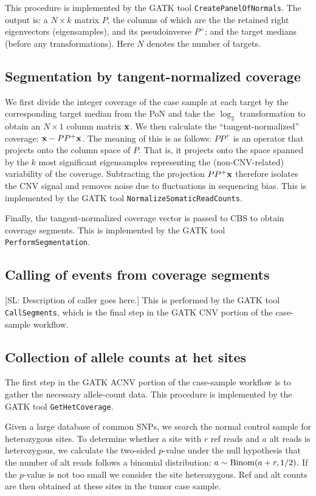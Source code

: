 \documentclass[nofootinbib,amssymb,amsmath]{revtex4}
\def\SL#1{{\color [rgb]{0,0,0.8} [SL: #1]}}
\begin{document}
This procedure is implemented by the GATK tool \texttt{CreatePanelOfNormals}.  The output is: a $N \times k$ matrix $P$, the columns of which are the the retained right eigenvectors (eigensamples), and its pseudoinverse $P^+$; and the target medians (before any transformations).  Here $N$ denotes the number of targets.

\subsection{Segmentation by tangent-normalized coverage}
We first divide the integer coverage of the case sample at each target by the corresponding target median from the PoN and take the $\log_2$ transformation to obtain an $N \times 1$ column matrix ${\bf x}$.  We then calculate the ``tangent-normalized'' coverage: ${\bf x} - PP^+ {\bf x}$.  The meaning of this is as follows: $PP^+$ is an operator that projects onto the column space of $P$.  That is, it projects onto the space spanned by the $k$ most significant eigensamples representing the (non-CNV-related) variability of the coverage.  Subtracting the projection $PP^+ {\bf x}$ therefore isolates the CNV signal and removes noise due to fluctuations in sequencing bias.  This is implemented by the GATK tool \texttt{NormalizeSomaticReadCounts}.

Finally, the tangent-normalized coverage vector is passed to CBS to obtain coverage segments.  This is implemented by the GATK tool \texttt{PerformSegmentation}.

\subsection{Calling of events from coverage segments} \label{gatk-cnv-caller}
\SL{Description of caller goes here.}  This is performed by the GATK tool \texttt{CallSegments}, which is the final step in the GATK CNV portion of the case-sample workflow.

\subsection{Collection of allele counts at het sites}
The first step in the GATK ACNV portion of the case-sample workflow is to gather the necessary allele-count data.  This procedure is implemented by the GATK tool \texttt{GetHetCoverage}.

Given a large database of common SNPs, we search the normal control sample for heterozygous sites.  To determine whether a site with $r$ ref reads and $a$ alt reads is heterozygous, we calculate the two-sided $p$-value under the null hypothesis that the number of alt reads follows a binomial distribution: $a \sim {\rm Binom}(a + r, 1/2)$.  If the $p$-value is not too small we consider the site heterozygous.  Ref and alt counts are then obtained at these sites in the tumor case sample.
\end{document}
